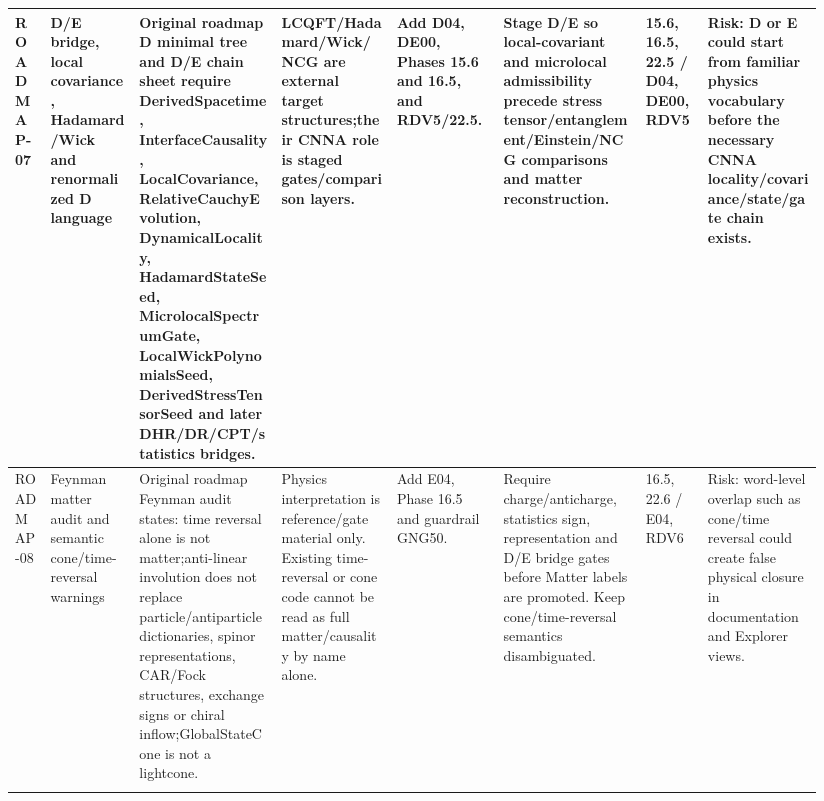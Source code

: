 \begin{longtable}{L{0.04\linewidth} L{0.105\linewidth} L{0.16\linewidth} L{0.13\linewidth} L{0.125\linewidth} L{0.165\linewidth} L{0.075\linewidth} L{0.135\linewidth}}
ROADMAP-07 & D/\allowbreak{}E bridge, local covariance, Hadamard/\allowbreak{}Wick and renormalized D language & Original roadmap D minimal tree and D/\allowbreak{}E chain sheet require DerivedSpacetime, InterfaceCausality, LocalCovariance, RelativeCauchyEvolution, DynamicalLocality, HadamardStateSeed, MicrolocalSpectrumGate, LocalWickPolynomialsSeed, DerivedStressTensorSeed and later DHR/\allowbreak{}DR/\allowbreak{}CPT/\allowbreak{}statistics bridges. & LCQFT/\allowbreak{}Hadamard/\allowbreak{}Wick/\allowbreak{}NCG are external target structures;\newline their CNNA role is staged gates/\allowbreak{}comparison layers. & Add D04, DE00, Phases 15.6 and 16.5, and RDV5/\allowbreak{}22.5. & Stage D/\allowbreak{}E so local-covariant and microlocal admissibility precede stress tensor/\allowbreak{}entanglement/\allowbreak{}Einstein/\allowbreak{}NCG comparisons and matter reconstruction. & 15.6, 16.5, 22.5 /\allowbreak{} D04, DE00, RDV5 & Risk: D or E could start from familiar physics vocabulary before the necessary CNNA locality/\allowbreak{}covariance/\allowbreak{}state/\allowbreak{}gate chain exists.\\
\hline
\addlinespace[0.24em]
ROADMAP-08 & Feynman matter audit and semantic cone/\allowbreak{}time-reversal warnings & Original roadmap Feynman audit states: time reversal alone is not matter;\newline anti-linear involution does not replace particle/\allowbreak{}antiparticle dictionaries, spinor representations, CAR/\allowbreak{}Fock structures, exchange signs or chiral inflow;\newline GlobalStateCone is not a lightcone. & Physics interpretation is reference/\allowbreak{}gate material only. Existing time-reversal or cone code cannot be read as full matter/\allowbreak{}causality by name alone. & Add E04, Phase 16.5 and guardrail GNG50. & Require charge/\allowbreak{}anticharge, statistics sign, representation and D/\allowbreak{}E bridge gates before Matter labels are promoted. Keep cone/\allowbreak{}time-reversal semantics disambiguated. & 16.5, 22.6 /\allowbreak{} E04, RDV6 & Risk: word-level overlap such as cone/\allowbreak{}time reversal could create false physical closure in documentation and Explorer views.\\
\hline
\addlinespace[0.24em]

\end{longtable}
